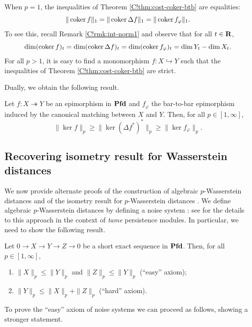 \begin{remark}
  When $p=1$, the inequalities of Theorem \ref{C!thm:cost-coker-btb} are equalities:
  \[
    \| \operatorname{coker} f \|_1 = \| \operatorname{coker} \Delta f \|_1 = \| \operatorname{coker} f_\varphi \|_1.
  \]
  To see this, recall Remark \ref{C!rmk:int-norm1} and observe that for all $t \in \mathbf{R}$,
  \[
    \dim (\operatorname{coker} f)_t = \dim (\operatorname{coker} \Delta f)_t = \dim (\operatorname{coker} f_\varphi)_t = \dim Y_t - \dim X_t.
  \]
  For all $p>1$, it is easy to find a monomorphism $f \colon X \hookrightarrow Y$ such that the inequalities of Theorem \ref{C!thm:cost-coker-btb} are strict.
\end{remark}

Dually, we obtain the following result.

\begin{theorem}
\label{C!thm:cost-ker-btb}
  Let $f \colon X \twoheadrightarrow Y$ be an epimorphism in $\operatorname{\mathbf{Pfd}}$ and $f_\varphi$ the bar-to-bar epimorphism induced by the canonical matching between $X$ and $Y$. Then, for all $p \in [1, \infty]$,
  \[
    \| \ker f \|_p \geq \| \ker (\Delta f^*)^* \|_p \geq \| \ker f_\varphi \|_p.
  \]
\end{theorem}

\subsection{Recovering isometry result for Wasserstein distances}
\label{C!SS:isometry}

We now provide alternate proofs of the construction of algebraic $p$-Wasserstein distances and of the isometry result for $p$-Wasserstein distances \cite{SkrabaTurner2023}. We define algebraic $p$-Wasserstein distances by defining a noise system \cite{SCLRÖ2017}: see \cite{AGRS2025} for the details to this approach in the context of \textit{tame} persistence modules. In particular, we need to show the following result.

\begin{proposition}
  Let $0 \to X \to Y \to Z \to 0$ be a short exact sequence in $\operatorname{\mathbf{Pfd}}$. Then, for all $p \in [1, \infty]$,
  \begin{enumerate}
    \item $\| X \|_p \leq \| Y \|_p$ and $\| Z \|_p \leq \| Y \|_p$ (``easy'' axiom);
    \item $\| Y \|_p \leq \| X \|_p + \| Z \|_p$ (``hard'' axiom).
  \end{enumerate}
\end{proposition}

To prove the ``easy'' axiom of noise systems we can proceed as follows, showing a stronger statement.

